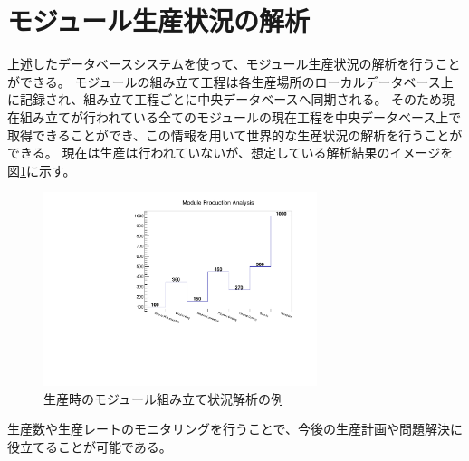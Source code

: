 \section{モジュール生産状況の解析}

上述したデータベースシステムを使って、モジュール生産状況の解析を行うことができる。
モジュールの組み立て工程は各生産場所のローカルデータベース上に記録され、組み立て工程ごとに中央データベースへ同期される。
そのため現在組み立てが行われている全てのモジュールの現在工程を中央データベース上で取得できることができ、この情報を用いて世界的な生産状況の解析を行うことができる。
現在は生産は行われていないが、想定している解析結果のイメージを図\ref{production_analysis}に示す。

\begin{figure}[bpt]\centering
\includegraphics[width=8cm,angle=270]{production_analysis}
\caption[生産時のモジュール組み立て状況解析の例]{生産時のモジュール組み立て状況解析の例}
\label{production_analysis}
\end{figure}

生産数や生産レートのモニタリングを行うことで、今後の生産計画や問題解決に役立てることが可能である。

